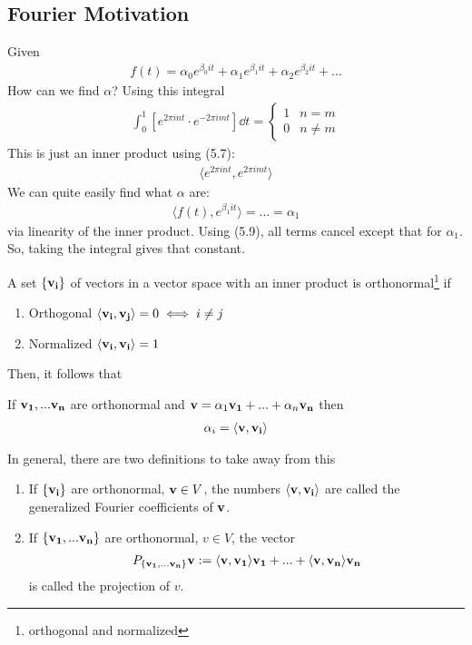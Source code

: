 \subsection{Fourier Motivation}
Given
\begin{align}
    f(t) = \alpha_0 e^{\beta_0 i t} + \alpha_1 e^{\beta_1 i t} + \alpha_2 e^{\beta_2 i t} + ...
\end{align}
How can we find $\alpha$? Using this integral
\begin{align}
    \int_0^1 \left[ e^{2\pi int} \cdot e^{-2\pi imt} \right] \dd{t} = \begin{cases}
        1 & n = m\\
        0 & n \ne m
    \end{cases}
\end{align}
This is just an inner product using (5.7):
\begin{align}
    \langle e^{2\pi i n t}, e^{2\pi i m t} \rangle
\end{align}
We can quite easily find what $\alpha$ are:
\begin{align}
    \langle f(t), e^{\beta_1 i t} \rangle = ... = \alpha_1
\end{align}
via linearity of the inner product. Using (5.9), all terms cancel except that for $\alpha_1$. So, taking the integral gives that constant.
\begin{definition}
    A set $\{ \vb{v_i} \}$ of vectors in a vector space with an inner product is orthonormal\footnote{orthogonal and normalized} if
    \begin{enumerate}
        \item Orthogonal $\langle \vb{v_i}, \vb{v_j} \rangle = 0 \iff i \ne j$
        \item Normalized $\langle \vb{v_i}, \vb{v_i} \rangle = 1$
    \end{enumerate}
\end{definition}
Then, it follows that
\begin{lemma}
    If $\vb{v_1}, ... \vb{v_n}$ are orthonormal and $\vb{v} = \alpha_1\vb{v_1} + ... + \alpha_n\vb{v_n}$ then
    \begin{align}
        \alpha_i = \langle \vb{v}, \vb{v_i} \rangle
    \end{align}
\end{lemma}
In general, there are two definitions to take away from this
\begin{definition}
    \begin{enumerate}
        \item If $\{ \vb{v_i} \}$ are orthonormal, $\vb{v} \in V$, the numbers $\langle \vb{v}, \vb{v_i} \rangle$ are called the generalized Fourier coefficients of $\vb{v}$.
        \item If $\{ \vb{v_1}, ... \vb{v_n}  \}$ are orthonormal, $v \in V$, the vector
        \begin{align}
            P_{\{ \vb{v_1}, ... \vb{v_n} \}} \vb{v} := \langle \vb{v}, \vb{v_1} \rangle \vb{v_1} + ... + \langle \vb{v}, \vb{v_n} \rangle \vb{v_n}
        \end{align}
        is called the projection of $v$.
    \end{enumerate}
\end{definition}

